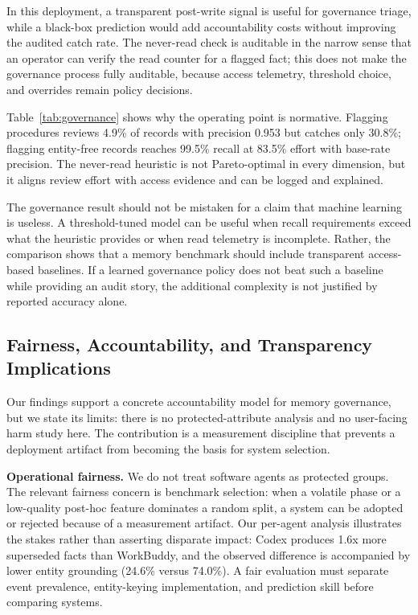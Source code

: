 \documentclass[sigconf,nonacm]{acmart}
\begin{document}
In this deployment, a transparent post-write signal is useful for governance triage, while a black-box prediction would add accountability costs without improving the audited catch rate. The never-read check is auditable in the narrow sense that an operator can verify the read counter for a flagged fact; this does not make the governance process fully auditable, because access telemetry, threshold choice, and overrides remain policy decisions.

Table~\ref{tab:governance} shows why the operating point is normative. Flagging procedures reviews 4.9\% of records with precision 0.953 but catches only 30.8\%; flagging entity-free records reaches 99.5\% recall at 83.5\% effort with base-rate precision. The never-read heuristic is not Pareto-optimal in every dimension, but it aligns review effort with access evidence and can be logged and explained.

The governance result should not be mistaken for a claim that machine learning is useless. A threshold-tuned model can be useful when recall requirements exceed what the heuristic provides or when read telemetry is incomplete. Rather, the comparison shows that a memory benchmark should include transparent access-based baselines. If a learned governance policy does not beat such a baseline while providing an audit story, the additional complexity is not justified by reported accuracy alone.



\subsection{Fairness, Accountability, and Transparency Implications}
\label{sec:faacct-implications}

Our findings support a concrete accountability model for memory governance, but we state its limits: there is no protected-attribute analysis and no user-facing harm study here. The contribution is a measurement discipline that prevents a deployment artifact from becoming the basis for system selection.

\textbf{Operational fairness.} We do not treat software agents as protected groups. The relevant fairness concern is benchmark selection: when a volatile phase or a low-quality post-hoc feature dominates a random split, a system can be adopted or rejected because of a measurement artifact. Our per-agent analysis illustrates the stakes rather than asserting disparate impact: Codex produces 1.6x more superseded facts than WorkBuddy, and the observed difference is accompanied by lower entity grounding (24.6\% versus 74.0\%). A fair evaluation must separate event prevalence, entity-keying implementation, and prediction skill before comparing systems.
\end{document}
